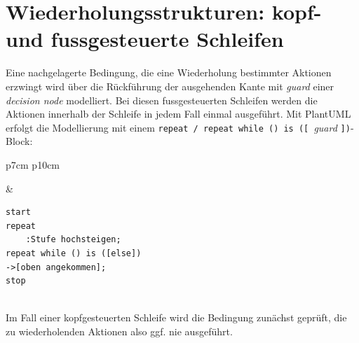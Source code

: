 \documentclass[10pt]{scrartcl}
\begin{document}
\section{Wiederholungsstrukturen: kopf- und fussgesteuerte Schleifen}
Eine nachgelagerte Bedingung, die eine Wiederholung bestimmter Aktionen erzwingt wird über die Rückführung der ausgehenden Kante mit \textit{guard} einer \textit{decision node} modelliert. Bei diesen fussgesteuerten Schleifen werden die Aktionen innerhalb der Schleife in jedem Fall einmal ausgeführt. Mit PlantUML erfolgt die Modellierung mit einem \texttt{repeat / repeat while () is ([ }\textit{guard} \texttt{])}-Block:

\begin{tabular}[b]{p{7cm} p{10cm}}
	
	&
	
	\begin{lstlisting}[style=plantuml]
start
repeat
	:Stufe hochsteigen;
repeat while () is ([else])
->[oben angekommen];
stop


	\end{lstlisting}
\end{tabular}

Im Fall einer kopfgesteuerten Schleife wird die Bedingung zunächst geprüft, die zu wiederholenden Aktionen also ggf. nie ausgeführt.
\end{document}
